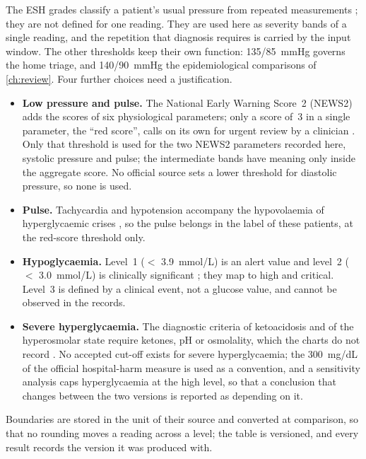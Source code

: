 The ESH grades classify a patient's usual pressure from repeated measurements \parencite{mancia2023}; they are not defined for one reading. They are used here as severity bands of a single reading, and the repetition that diagnosis requires is carried by the input window. The other thresholds keep their own function: 135/85~mmHg governs the home triage, and 140/90~mmHg the epidemiological comparisons of \cref{ch:review}. Four further choices need a justification.
\begin{itemize}
  \item \textbf{Low pressure and pulse.} The National Early Warning Score~2 (NEWS2) adds the scores of six physiological parameters; only a score of~3 in a single parameter, the ``red score'', calls on its own for urgent review by a clinician \parencite{rcp2017news2}. Only that threshold is used for the two NEWS2 parameters recorded here, systolic pressure and pulse; the intermediate bands have meaning only inside the aggregate score. No official source sets a lower threshold for diastolic pressure, so none is used.
  \item \textbf{Pulse.} Tachycardia and hypotension accompany the hypovolaemia of hyperglycaemic crises \parencite{umpierrez2024}, so the pulse belongs in the label of these patients, at the red-score threshold only.
  \item \textbf{Hypoglycaemia.} Level~1 ($<$ 3.9~mmol/L) is an alert value and level~2 ($<$ 3.0~mmol/L) is clinically significant \parencite{ihsg2017}; they map to high and critical. Level~3 is defined by a clinical event, not a glucose value, and cannot be observed in the records.
  \item \textbf{Severe hyperglycaemia.} The diagnostic criteria of ketoacidosis and of the hyperosmolar state require ketones, pH or osmolality, which the charts do not record \parencite{umpierrez2024}. No accepted cut-off exists for severe hyperglycaemia; the 300~mg/dL of the official hospital-harm measure \parencite{cms871} is used as a convention, and a sensitivity analysis caps hyperglycaemia at the high level, so that a conclusion that changes between the two versions is reported as depending on it.
\end{itemize}
Boundaries are stored in the unit of their source and converted at comparison, so that no rounding moves a reading across a level; the table is versioned, and every result records the version it was produced with.

